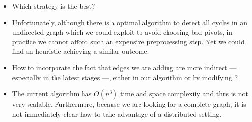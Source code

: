 \begin{itemize}
	\item Which strategy is the best?
	\item Unfortunately, although there is a optimal algorithm to detect all
		cycles in an undirected graph \autocite{Cycles13} which we could
		exploit to avoid choosing bad pivots, in practice we cannot afford
		such an expensive preprocessing step. Yet we could find an heuristic
		achieving a similar outcome.
	\item How to incorporate the fact that edges we are adding are more
		indirect --- especially in the latest stages ---, either in our
		algorithm or by modifying \ccp{}?
	\item The current algorithm has $O(n^3)$ time and space complexity and
		thus is not very scalable. Furthermore, because we are looking for a
		complete graph, it is not immediately clear how to take advantage of a
		distributed setting.
\end{itemize}

